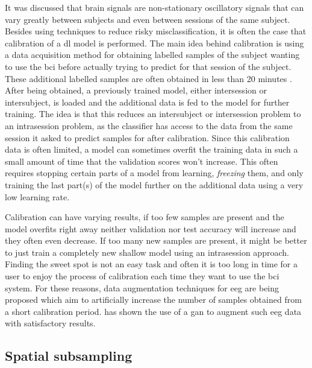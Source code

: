 It was discussed that brain signals are non-stationary oscillatory signals that can vary greatly between subjects and even between sessions of the same subject.
Besides using techniques to reduce risky misclassification, it is often the case that calibration of a \gls{dl} model is performed.
The main idea behind calibration is using a data acquisition method for obtaining labelled samples of the subject wanting to use the \gls{bci} before actually trying to predict for that session of the subject.
These additional labelled samples are often obtained in less than 20 minutes \citep{eeg_model_eegnet}.
After being obtained, a previously trained model, either intersession or intersubject, is loaded and the additional data is fed to the model for further training.
The idea is that this reduces an intersubject or intersession problem to an intrasession problem, as the classifier has access to the data from the same session it asked to predict samples for after calibration.
Since this calibration data is often limited, a model can sometimes overfit the training data in such a small amount of time that the validation scores won't increase.
This often requires stopping certain parts of a model from learning, \textit{freezing} them, and only training the last part(s) of the model further on the additional data using a very low learning rate.

Calibration can have varying results, if too few samples are present and the model overfits right away neither validation nor test accuracy will increase and they often even decrease.
If too many new samples are present, it might be better to just train a completely new shallow model using an intrasession approach.
Finding the sweet spot is not an easy task and often it is too long in time for a user to enjoy the process of calibration each time they want to use the \gls{bci} system.
For these reasons, data augmentation techniques for \gls{eeg} are being proposed which aim to artificially increase the number of samples obtained from a short calibration period.
\citet{gan_eeg_augmentation} has shown the use of a \gls{gan} to augment such \gls{eeg} data with satisfactory results.




\subsection{Spatial subsampling}
\label{subsec:online_bci_system_different_common_steps_subsampling} 

